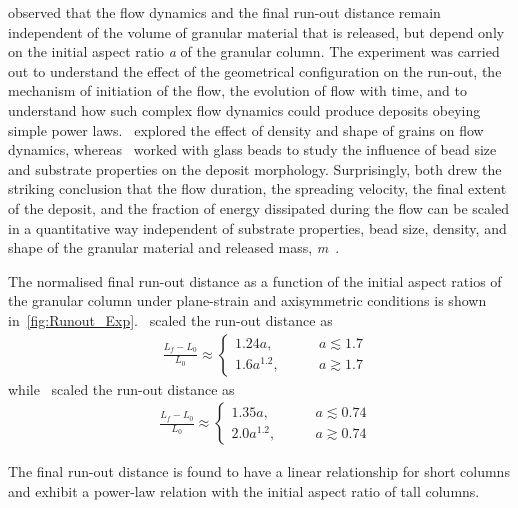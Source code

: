 \citet{Lajeunesse2005} observed that the flow dynamics and the final run-out 
distance remain independent of the volume of granular material that is 
released, but depend only on the initial aspect ratio \textit{a} of the 
granular column. The experiment was carried out to understand the effect of the 
geometrical configuration on the run-out, the mechanism of initiation of the 
flow, the evolution of flow with time, and to understand how such complex flow 
dynamics could produce deposits obeying simple power laws.~\citet{Lube2005} 
explored the effect of density and shape of grains on flow dynamics, 
whereas~\citet{Lajeunesse2004} worked with glass beads to study the influence 
of bead size and substrate properties on the deposit morphology. Surprisingly, 
both drew the striking conclusion that the flow duration, the spreading 
velocity, the final extent of the deposit, and the fraction of energy 
dissipated during the flow can be scaled in a quantitative way independent of 
substrate properties, bead size, density, and shape of the granular material 
and released mass, \textit{m}~\citep{Lajeunesse2005}.

The normalised final run-out distance as a function of the initial aspect 
ratios of the granular column under plane-strain and axisymmetric conditions 
is shown in~\cref{fig:Runout_Exp}.~\citet{Lube2005} scaled the run-out distance 
as
\begin{align}
& \frac{\textit{L}_{\textit{f}}- 
\textit{L}_{\textit{0}}}{\textit{L}_{\textit{0}}} \approx
\begin{cases} 
1.24\textit{a}, \qquad &\textit{a} \lesssim 1.7 \\
1.6\textit{a}^{1.2}, \qquad &\textit{a} \gtrsim 1.7
\end{cases}
\end{align}
while~\citet{Lajeunesse2005} scaled the run-out distance as
\begin{align}
& \frac{\textit{L}_{\textit{f}}- 
\textit{L}_{\textit{0}}}{\textit{L}_{\textit{0}}} \approx
\begin{cases} 
1.35\textit{a}, \qquad &\textit{a} \lesssim 0.74 \\
2.0\textit{a}^{1.2}, \qquad &\textit{a} \gtrsim 0.74
\end{cases}
\end{align} 

The final run-out distance is found to have a linear relationship for short 
columns and exhibit a power-law relation with the initial aspect ratio of tall 
columns. 

